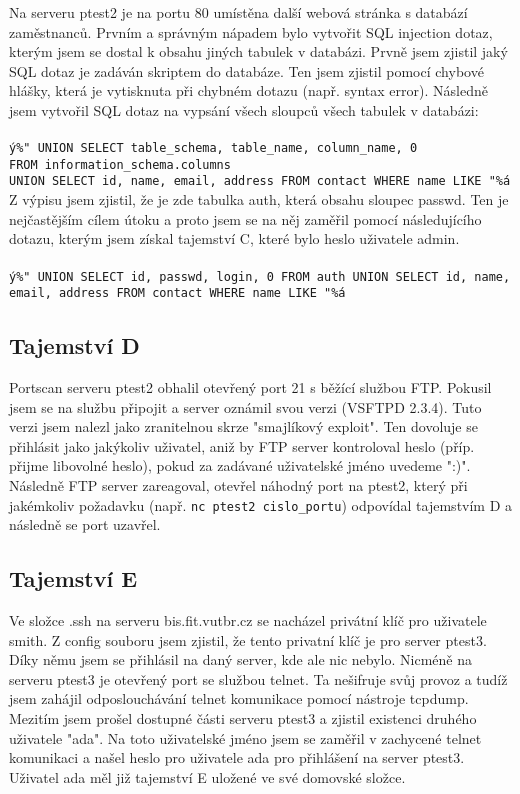 \documentclass[11pt,a4paper]{article}
\begin{document}
Na serveru ptest2 je na portu 80 umístěna další webová stránka s databází zaměstnanců. Prvním a správným nápadem bylo vytvořit SQL injection dotaz, kterým jsem se dostal k obsahu jiných tabulek v databázi. Prvně jsem zjistil jaký SQL dotaz je zadáván skriptem do databáze. Ten jsem zjistil pomocí chybové hlášky, která je vytisknuta při chybném dotazu (např. syntax error). Následně jsem vytvořil SQL dotaz na vypsání všech sloupců všech tabulek v databázi: \\
\\
\texttt{ý\%"\  UNION SELECT table\_schema, table\_name, column\_name, 0 \\FROM information\_schema.columns \\UNION SELECT id, name, email, address FROM contact WHERE name LIKE "\%á}
\\

Z výpisu jsem zjistil, že je zde tabulka auth, která obsahu sloupec passwd. Ten je nejčastějším cílem útoku a proto jsem se na něj zaměřil pomocí následujícího dotazu, kterým jsem získal tajemství C, které bylo heslo uživatele admin.
\\
\\
\texttt{ý\%"\ UNION SELECT id, passwd, login, 0 FROM auth UNION SELECT id, name, email, address FROM contact WHERE name LIKE "\%á}

\subsection{Tajemství D}
Portscan serveru ptest2 obhalil otevřený port 21 s běžící službou FTP. Pokusil jsem se na službu připojit a server oznámil svou verzi (VSFTPD 2.3.4). Tuto verzi jsem nalezl jako zranitelnou skrze "smajlíkový exploit". Ten dovoluje se přihlásit jako jakýkoliv uživatel, aniž by FTP server kontroloval heslo (příp. přijme libovolné heslo), pokud za zadávané uživatelské jméno uvedeme ":)". Následně FTP server zareagoval, otevřel náhodný port na ptest2, který při jakémkoliv požadavku (např. \texttt{nc ptest2 cislo\_portu}) odpovídal tajemstvím D a následně se port uzavřel.

\subsection{Tajemství E}

Ve složce .ssh na serveru bis.fit.vutbr.cz se nacházel privátní klíč pro uživatele smith. Z config souboru jsem zjistil, že tento privatní klíč je pro server ptest3. Díky němu jsem se přihlásil na daný server, kde ale nic nebylo. Nicméně na serveru ptest3 je otevřený port se službou telnet. Ta nešifruje svůj provoz a tudíž jsem zahájil odposlouchávání telnet komunikace pomocí nástroje tcpdump. Mezitím jsem prošel dostupné části serveru ptest3 a zjistil existenci druhého uživatele "ada". Na toto uživatelské jméno jsem se zaměřil v zachycené telnet komunikaci a našel heslo pro uživatele ada pro přihlášení na server ptest3. Uživatel ada měl již tajemství E uložené ve své domovské složce.
\end{document}
